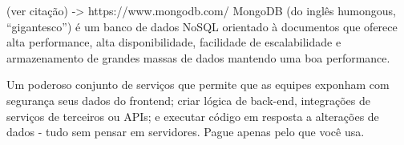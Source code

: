 (ver citação) -> https://www.mongodb.com/
MongoDB (do inglês humongous, “gigantesco”) é um banco de dados NoSQL
orientado à documentos que oferece alta performance, alta disponibilidade, facilidade de
escalabilidade e armazenamento de grandes massas de dados mantendo uma boa performance.

Um poderoso conjunto de serviços que permite que as equipes exponham com segurança seus dados do frontend; criar lógica de back-end, integrações de serviços de terceiros ou APIs; e executar código em resposta a alterações de dados - tudo sem pensar em servidores. Pague apenas pelo que você usa.






